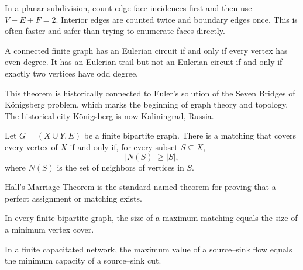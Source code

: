     \begin{strategy}
        In a planar subdivision, count edge-face incidences first and then use
        $V-E+F=2$. Interior edges are counted twice and boundary edges once.
        This is often faster and safer than trying to enumerate faces directly.
    \end{strategy}

    \begin{theorem}
        A connected finite graph has an Eulerian circuit if and only if every
        vertex has even degree. It has an Eulerian trail but not an Eulerian
        circuit if and only if exactly two vertices have odd degree.
    \end{theorem}

    \begin{remark}
        This theorem is historically connected to Euler's solution of the
        Seven Bridges of K\"onigsberg problem, which marks the beginning of
        graph theory and topology. The historical city K\"onigsberg is now
        Kaliningrad, Russia.
    \end{remark}

    \begin{theorem}
        Let $G=(X\cup Y,E)$ be a finite bipartite graph. There is a matching
        that covers every vertex of $X$ if and only if, for every subset
        $S\subseteq X$,
        \[
            |N(S)|\geq |S|,
        \]
        where $N(S)$ is the set of neighbors of vertices in $S$.
    \end{theorem}

    \begin{strategy}
        Hall's Marriage Theorem is the standard named theorem for proving that
        a perfect assignment or matching exists.
    \end{strategy}

    \begin{theorem}
        In every finite bipartite graph, the size of a maximum matching equals
        the size of a minimum vertex cover.
    \end{theorem}

    \begin{theorem}
        In a finite capacitated network, the maximum value of a source--sink
        flow equals the minimum capacity of a source--sink cut.
    \end{theorem}

